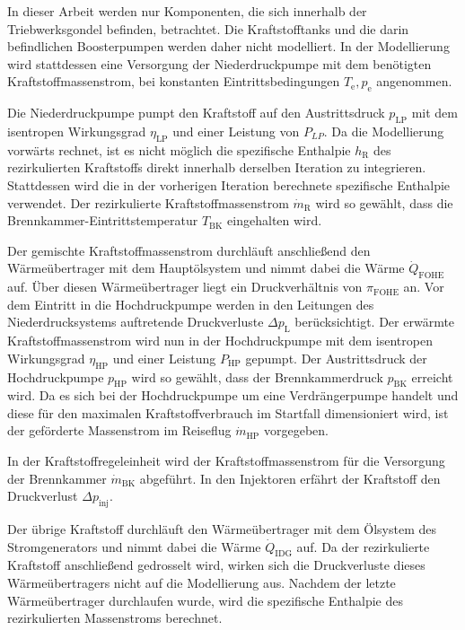 In dieser Arbeit werden nur Komponenten, die sich innerhalb der Triebwerksgondel befinden, betrachtet. Die Kraftstofftanks und die darin befindlichen Boosterpumpen werden daher nicht modelliert. In der Modellierung wird stattdessen eine Versorgung der Niederdruckpumpe mit dem benötigten Kraftstoffmassenstrom, bei konstanten Eintrittsbedingungen $T_\mathrm{e}, p_\mathrm{e}$ angenommen. 

Die Niederdruckpumpe pumpt den Kraftstoff auf den Austrittsdruck $p_{\mathrm{LP}}$ mit dem isentropen Wirkungsgrad $\eta_{\mathrm{LP}}$ und einer Leistung von $P_{LP}$. Da die Modellierung vorwärts rechnet, ist es nicht möglich die spezifische Enthalpie $h_\mathrm{R}$ des rezirkulierten Kraftstoffs direkt innerhalb derselben Iteration zu integrieren. Stattdessen wird die in der vorherigen Iteration berechnete spezifische Enthalpie verwendet. Der rezirkulierte Kraftstoffmassenstrom $\dot{m}_\mathrm{R}$ wird so gewählt, dass die Brennkammer-Eintrittstemperatur $T_{\mathrm{BK}}$ eingehalten wird. 

Der gemischte Kraftstoffmassenstrom durchläuft anschließend den Wärmeübertrager mit dem Hauptölsystem und nimmt dabei die Wärme $\dot{Q}_{\mathrm{FOHE}}$ auf. Über diesen Wärmeübertrager liegt ein Druckverhältnis von $\pi_{\mathrm{FOHE}}$ an. Vor dem Eintritt in die Hochdruckpumpe werden in den Leitungen des Niederdrucksystems auftretende Druckverluste $\Delta p_{\mathrm{L}}$  berücksichtigt. Der erwärmte Kraftstoffmassenstrom wird nun in der Hochdruckpumpe mit dem isentropen Wirkungsgrad $\eta_{\mathrm{HP}}$ und einer Leistung $P_{\mathrm{HP}}$ gepumpt. Der Austrittsdruck der Hochdruckpumpe $p_{\mathrm{HP}}$ wird so gewählt, dass der Brennkammerdruck $p_{\mathrm{BK}}$ erreicht wird.  Da es sich bei der Hochdruckpumpe um eine Verdrängerpumpe handelt und diese für den maximalen Kraftstoffverbrauch im Startfall dimensioniert wird, ist der geförderte Massenstrom im Reiseflug $\dot{m}_{\mathrm{HP}}$ vorgegeben. 

In der Kraftstoffregeleinheit wird der Kraftstoffmassenstrom für die Versorgung der Brennkammer $\dot{m}_{\mathrm{BK}}$ abgeführt. In den Injektoren erfährt der Kraftstoff den Druckverlust $\Delta p_{\mathrm{inj}}$. 

Der übrige Kraftstoff durchläuft den Wärmeübertrager mit dem Ölsystem des Stromgenerators und nimmt dabei die Wärme $\dot{Q}_{\mathrm{IDG}}$ auf. Da der rezirkulierte Kraftstoff anschließend gedrosselt wird, wirken sich die Druckverluste dieses Wärmeübertragers nicht auf die Modellierung aus. Nachdem der letzte Wärmeübertrager durchlaufen wurde, wird die spezifische Enthalpie des rezirkulierten Massenstroms berechnet.

